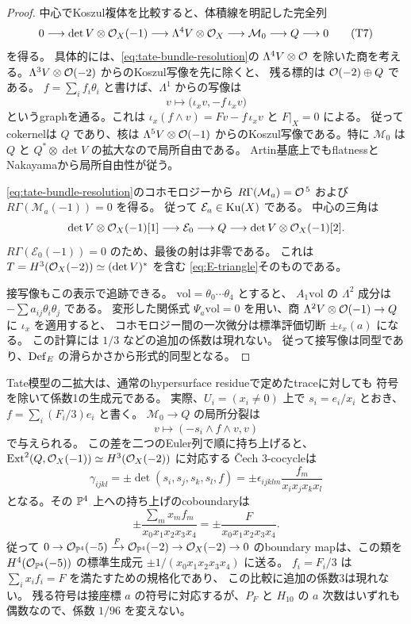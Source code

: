 \begin{proof}
中心でKoszul複体を比較すると、体積線を明記した完全列
\[
 0\longrightarrow\det V\otimes\mathcal O_X(-1)
 \longrightarrow\Lambda^4V\otimes\mathcal O_X
 \longrightarrow\mathcal M_0
 \longrightarrow Q\longrightarrow0
 \tag{T7}\label{eq:tate-central-evaluation}
\]
を得る。
具体的には、\eqref{eq:tate-bundle-resolution}の $\Lambda^4V\otimes\mathcal O$
を除いた商を考える。$\Lambda^3V\otimes\mathcal O(-2)$ からのKoszul写像を先に除くと、
残る標的は $\mathcal O(-2)\oplus Q$ である。
$f=\sum_i f_i\theta_i$ と書けば、$\Lambda^1$ からの写像は
\[
 v\longmapsto\bigl(\iota_xv,-f\,\iota_xv\bigr)
\]
というgraphを通る。これは
$\iota_x(f\wedge v)=Fv-f\,\iota_xv$ と $F|_X=0$ による。
従ってcokernelは $Q$ であり、核は $\Lambda^5V\otimes\mathcal O(-1)$
からのKoszul写像である。特に $\mathcal M_0$ は $Q$ と
$Q^*\otimes\det V$ の拡大なので局所自由である。
Artin基底上でもflatnessとNakayamaから局所自由性が従う。

\eqref{eq:tate-bundle-resolution}のコホモロジーから
$R\Gamma(\mathcal M_a)=\mathcal O^{\,5}$ および
$R\Gamma(\mathcal M_a(-1))=0$ を得る。
従って $\mathcal E_a\in\operatorname{Ku}(X)$ である。
中心の三角は
\[
 \det V\otimes\mathcal O_X(-1)[1]\longrightarrow\mathcal E_0
 \longrightarrow Q\longrightarrow\det V\otimes\mathcal O_X(-1)[2].
\]
$R\Gamma(\mathcal E_0(-1))=0$ のため、最後の射は非零である。
これは $T=H^3(\mathcal O_X(-2))\simeq(\det V)^*$ を含む
\eqref{eq:E-triangle}そのものである。

接写像もこの表示で追跡できる。
$\mathrm{vol}=\theta_0\cdots\theta_4$ とすると、
$A_1\mathrm{vol}$ の $\Lambda^2$ 成分は $-\sum a_{ij}\theta_i\theta_j$ である。
変形した関係式 $\Psi_a\mathrm{vol}=0$ を用い、商
$\Lambda^2V\otimes\mathcal O(-1)\to Q$ に $\iota_x$ を適用すると、
コホモロジー間の一次微分は標準評価切断 $\pm\iota_x(a)$ になる。
この計算には $1/3$ などの追加の係数は現れない。
従って接写像は同型であり、$\operatorname{Def}_E$ の滑らかさから形式的同型となる。
\end{proof}


\begin{remark}
\label{rem:tate-serre-trace-normalization}
Tate模型の二拡大は、通常のhypersurface residueで定めたtraceに対しても
符号を除いて係数1の生成元である。
実際、$U_i=(x_i\ne0)$ 上で $s_i=e_i/x_i$ とおき、
$f=\sum_i(F_i/3)e_i$ と書く。
$\mathcal M_0\to Q$ の局所分裂は
\[
 v\longmapsto(-s_i\wedge f\wedge v,v)
\]
で与えられる。
この差を二つのEuler列で順に持ち上げると、
$\operatorname{Ext}^2(Q,\mathcal O_X(-1))\simeq H^3(\mathcal O_X(-2))$ に対応する
\v Cech 3-cocycleは
\[
 \gamma_{ijkl}
   =\pm\det(s_i,s_j,s_k,s_l,f)
   =\pm\epsilon_{ijklm}\frac{f_m}{x_ix_jx_kx_l}
\]
となる。その $\mathbb P^4$ 上への持ち上げのcoboundaryは
\[
 \pm\frac{\sum_m x_mf_m}{x_0x_1x_2x_3x_4}
   =\pm\frac{F}{x_0x_1x_2x_3x_4}.
\]
従って $0\to\mathcal O_{\mathbb P^4}(-5)\xrightarrow{F}\mathcal O_{\mathbb P^4}(-2)
\to\mathcal O_X(-2)\to0$ のboundary mapは、この類を
$H^4(\mathcal O_{\mathbb P^4}(-5))$ の標準生成元
$\pm1/(x_0x_1x_2x_3x_4)$ に送る。
$f_i=F_i/3$ は $\sum_i x_if_i=F$ を満たすための規格化であり、
この比較に追加の係数3は現れない。
残る符号は接座標 $a$ の符号に対応するが、$P_F$ と $H_{10}$ の
$a$ 次数はいずれも偶数なので、係数 $1/96$ を変えない。
\end{remark}

